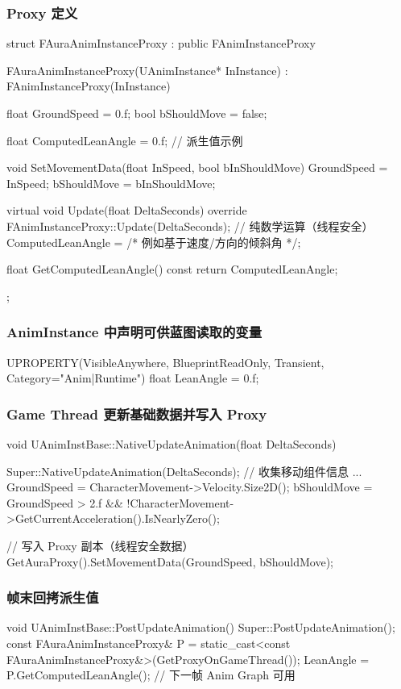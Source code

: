 \documentclass[10pt,openright,oneside,CJKmath]{MyBook}
\begin{document}
\subsubsection*{Proxy 定义}
\begin{code}
struct FAuraAnimInstanceProxy : public FAnimInstanceProxy
{
    FAuraAnimInstanceProxy(UAnimInstance* InInstance)
        : FAnimInstanceProxy(InInstance) {}

    float GroundSpeed = 0.f;
    bool  bShouldMove = false;

    float ComputedLeanAngle = 0.f; // 派生值示例

    void SetMovementData(float InSpeed, bool bInShouldMove)
    {
        GroundSpeed = InSpeed;
        bShouldMove = bInShouldMove;
    }

    virtual void Update(float DeltaSeconds) override
    {
        FAnimInstanceProxy::Update(DeltaSeconds);
        // 纯数学运算（线程安全）
        ComputedLeanAngle = /* 例如基于速度/方向的倾斜角 */;
    }

    float GetComputedLeanAngle() const { return ComputedLeanAngle; }
};
\end{code}

\subsubsection*{AnimInstance 中声明可供蓝图读取的变量}
\begin{code}
UPROPERTY(VisibleAnywhere, BlueprintReadOnly, Transient, Category="Anim|Runtime")
float LeanAngle = 0.f;
\end{code}

\subsubsection*{Game Thread 更新基础数据并写入 Proxy}
\begin{code}
void UAnimInstBase::NativeUpdateAnimation(float DeltaSeconds)
{
    Super::NativeUpdateAnimation(DeltaSeconds);
    // 收集移动组件信息 ...
    GroundSpeed = CharacterMovement->Velocity.Size2D();
    bShouldMove = GroundSpeed > 2.f &&
                  !CharacterMovement->GetCurrentAcceleration().IsNearlyZero();

    // 写入 Proxy 副本（线程安全数据）
    GetAuraProxy().SetMovementData(GroundSpeed, bShouldMove);
}
\end{code}

\subsubsection*{帧末回拷派生值}
\begin{code}
void UAnimInstBase::PostUpdateAnimation()
{
    Super::PostUpdateAnimation();
    const FAuraAnimInstanceProxy& P =
        static_cast<const FAuraAnimInstanceProxy&>(GetProxyOnGameThread());
    LeanAngle = P.GetComputedLeanAngle(); // 下一帧 Anim Graph 可用
}
\end{code}
\end{document}
